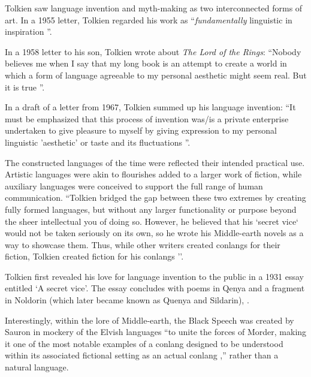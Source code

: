 \documentclass[14pt, a4paper]{extreport}
\begin{document}
Tolkien saw language invention and myth-making as two interconnected forms of art. In a 1955 letter, Tolkien regarded his work as ``\textit{fundamentally} linguistic in inspiration \parencite[233]{letters}''.

In a 1958 letter to his son, Tolkien wrote about \textit{The Lord of the Rings}: ``Nobody believes me when I say that my long book is an attempt to create a world in which a form of language agreeable to my personal aesthetic might seem real. But it is true \parencite[285]{letters}''.

In a draft of a letter from 1967, Tolkien summed up his language invention: ``It must be emphasized that this process of invention was/is a private enterprise undertaken to give pleasure to myself by giving expression to my personal linguistic 'aesthetic' or taste and its fluctuations \parencite[411]{letters}''.

The constructed languages of the time were reflected their intended practical use. Artistic languages were akin to flourishes added to a larger work of fiction, while auxiliary languages were conceived to support the full range of human communication. ``Tolkien bridged the gap between these two extremes by creating fully formed languages, but without any larger functionality or purpose beyond the sheer intellectual you of doing so. However, he believed that his `secret vice` would not be taken seriously on its own, so he wrote his Middle-earth novels as a way to showcase them. Thus, while other writers created conlangs for their fiction, Tolkien created fiction for his conlangs \parencite{sanders}''.

Tolkien first revealed his love for language invention to the public in a 1931 essay entitled `A secret vice'. The essay concludes with poems in Qenya and a fragment in Noldorin (which later became known as Quenya and Sildarin), \parencite{tolkien83}.



Interestingly, within the lore of Middle-earth, the Black Speech was created by Sauron in mockery of the Elvish languages \parencite[20]{tolkien19} ``to unite the forces of Morder, making it one of the most notable examples of a conlang designed to be understood within its associated fictional setting as an actual conlang \parencite{sanders},'' rather than a natural language.
\end{document}
